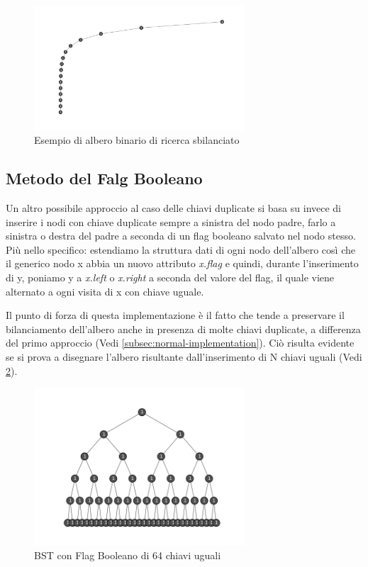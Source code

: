 \documentclass{article}
\begin{document}
\begin{figure}[H]
  \centering
  \includegraphics[width=0.7\textwidth]{./images/bst-normal-img3}
  \caption{Esempio di albero binario di ricerca sbilanciato}
  \label{fig:bst-normal-img3}
\end{figure}



\subsection{Metodo del Falg Booleano}
\label{subsec:fag-implementation}

Un altro possibile approccio al caso delle chiavi duplicate si basa su invece di inserire i nodi con chiave duplicate sempre a sinistra del nodo padre, farlo a sinistra o destra del padre a seconda di un flag booleano salvato nel nodo stesso. Più nello specifico: estendiamo la struttura dati di ogni nodo dell'albero così che il generico nodo x abbia un nuovo attributo \textit{x.flag} e quindi, durante l'inserimento di y, poniamo y a \textit{x.left} o \textit{x.right} a seconda del valore del flag, il quale viene alternato a ogni visita di x con chiave uguale. 

Il punto di forza di questa implementazione è il fatto che tende a preservare il bilanciamento dell'albero anche in presenza di molte chiavi duplicate, a differenza del primo approccio (Vedi \ref{subsec:normal-implementation}). Ciò risulta evidente se si prova a disegnare l'albero risultante dall'inserimento di N chiavi uguali (Vedi \cref{fig:bst-flag}).



\begin{figure}[H]
  \centering
  \includegraphics[width=0.7\textwidth]{./images/bst-flag}
  \caption{BST con Flag Booleano di 64 chiavi uguali}
  \label{fig:bst-flag}
\end{figure}
\end{document}
